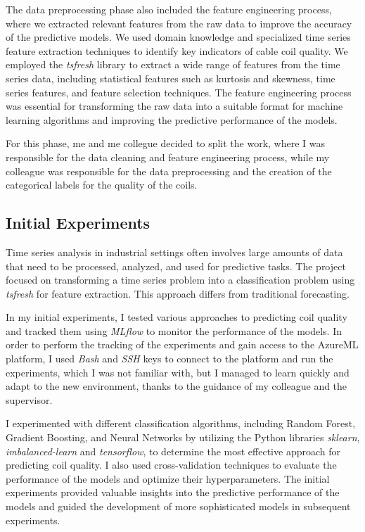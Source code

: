 The data preprocessing phase also included the feature engineering process,
where we extracted relevant features from the raw data to improve the accuracy
of the predictive models. We used domain knowledge and specialized time series
feature extraction techniques to identify key indicators of cable coil quality.
We employed the \emph{tsfresh} library to extract a wide range of features from
the time series data, including statistical features such as kurtosis and
skewness, time series features, and feature selection techniques. The feature
engineering process was essential for transforming the raw data into a suitable
format for machine learning algorithms and improving the predictive performance
of the models.

For this phase, me and me collegue decided to split the work, where I was
responsible for the data cleaning and feature engineering process, while my
colleague was responsible for the data preprocessing and the creation of the
categorical labels for the quality of the coils.

\subsection{Initial Experiments}

Time series analysis in industrial settings often involves large amounts of
data that need to be processed, analyzed, and used for predictive tasks. The
project focused on transforming a time series problem into a classification
problem using \emph{tsfresh} for feature extraction. This approach differs from
traditional forecasting.

In my initial experiments, I tested various approaches to predicting coil
quality and tracked them using \emph{MLflow} to monitor the performance of the
models. In order to perform the tracking of the experiments and gain access to
the AzureML platform, I used \emph{Bash} and \emph{SSH} keys to connect to the
platform and run the experiments, which I was not familiar with, but I managed
to learn quickly and adapt to the new environment, thanks to the guidance of my
colleague and the supervisor.

I experimented with different classification algorithms, including
Random Forest, Gradient Boosting, and Neural Networks by utilizing the Python
libraries \emph{sklearn}, \emph{imbalanced-learn} and \emph{tensorflow}, to
determine the most effective approach for predicting coil quality. I also used
cross-validation techniques to evaluate the performance of the models and
optimize their hyperparameters. The initial experiments provided valuable
insights into the predictive performance of the models and guided the
development of more sophisticated models in subsequent experiments.

